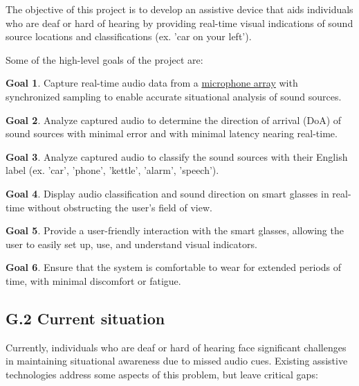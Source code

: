 \documentclass[12pt]{article}
\theoremstyle{definition}
\newtheorem{goal}{Goal}
\begin{document}
The objective of this project is to develop an assistive device that aids
individuals who are deaf or hard of hearing by providing real-time visual
indications of sound source locations and classifications (ex. 'car on your 
left').

Some of the high-level goals of the project are:

\begin{goal}\label{goal:audio_capture} Capture real-time audio data from a 
\hyperref[def:microphone_array]{microphone array}
with synchronized sampling to enable accurate situational analysis of sound
sources.
\end{goal}

\begin{goal}\label{goal:audio_direction_analysis} Analyze captured audio to
determine the direction of arrival (DoA) of sound sources with minimal error and
with minimal latency nearing real-time.
\end{goal}

\begin{goal}\label{goal:audio_identification_analysis} Analyze captured audio to
classify the sound sources with their English label (ex. 'car', 'phone',
'kettle', 'alarm', 'speech').
\end{goal}

\begin{goal}\label{goal:visual_display} Display audio classification and sound
direction on smart glasses in real-time without obstructing the user's field of
view.
\end{goal}

\begin{goal}\label{goal:user_friendly_interaction} Provide a user-friendly
interaction with the smart glasses, allowing the user to easily set up, use, and
understand visual indicators.
\end{goal}

\begin{goal}\label{goal:user_comfort} Ensure that the system is comfortable to
wear for extended periods of time, with minimal discomfort or fatigue.
\end{goal}
    
\subsection{G.2 Current situation}

Currently, individuals who are deaf or hard of hearing face significant
challenges in maintaining situational awareness due to missed audio cues.
Existing assistive technologies address some aspects of this problem, but leave
critical gaps:
\end{document}
